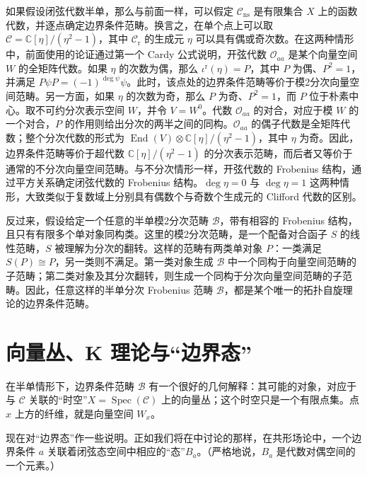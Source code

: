 如果假设闭弦代数半单，那么与前面一样，可以假定 $\mathcal{C}_{\mathrm{ns}}$ 是有限集合 $X$ 上的函数代数，并逐点确定边界条件范畴。换言之，在单个点上可以取 $\mathcal{C}=\mathbb{C}[\eta]/(\eta^2-1)$，其中 $\mathcal{C}_{\mathrm{r}}$ 的生成元 $\eta$ 可以具有偶或奇次数。在这两种情形中，前面使用的论证通过第一个 Cardy 公式说明，开弦代数 $\mathcal{O}_{aa}$ 是某个向量空间 $W$ 的全矩阵代数。如果 $\eta$ 的次数为偶，那么 $\iota^{\mathrm{r}}(\eta)=P$，其中 $P$ 为偶、$P^2=1$，并满足 $P\psi P=(-1)^{\deg\psi}\psi$。此时，该点处的边界条件范畴等价于模2分次向量空间范畴。另一方面，如果 $\eta$ 的次数为奇，那么 $P$ 为奇、$P^2=1$，而 $P$ 位于朴素中心。取不可约分次表示空间 $W$，并令 $V=W^0$。代数 $\mathcal{O}_{aa}$ 的对合，对应于模 $W$ 的一个对合，$P$ 的作用则给出分次的两半之间的同构。$\mathcal{O}_{aa}$ 的偶子代数是全矩阵代数；整个分次代数的形式为 $\operatorname{End}(V)\otimes\mathbb{C}[\eta]/(\eta^2-1)$，其中 $\eta$ 为奇。因此，边界条件范畴等价于超代数 $\mathbb{C}[\eta]/(\eta^2-1)$ 的分次表示范畴，而后者又等价于通常的不分次向量空间范畴。与不分次情形一样，开弦代数的 Frobenius 结构，通过平方关系确定闭弦代数的 Frobenius 结构。$\deg\eta=0$ 与 $\deg\eta=1$ 这两种情形，大致类似于复数域上分别具有偶数个与奇数个生成元的 Clifford 代数的区别。

反过来，假设给定一个任意的半单模2分次范畴 $\mathcal{B}$，带有相容的 Frobenius 结构，且只有有限多个单对象同构类。这里的模2分次范畴，是一个配备对合函子 $S$ 的线性范畴，$S$ 被理解为分次的翻转。这样的范畴有两类单对象 $P$：一类满足 $S(P)\cong P$，另一类则不满足。第一类对象生成 $\mathcal{B}$ 中一个同构于向量空间范畴的子范畴；第二类对象及其分次翻转，则生成一个同构于分次向量空间范畴的子范畴。因此，任意这样的半单分次 Frobenius 范畴 $\mathcal{B}$，都是某个唯一的拓扑自旋理论的边界条件范畴。

\section{向量丛、K 理论与“边界态”}\label{sec:2.3}

在半单情形下，边界条件范畴 $\mathcal{B}$ 有一个很好的几何解释：其可能的对象，对应于与 $\mathcal{C}$ 关联的“时空”$X=\operatorname{Spec}(\mathcal{C})$ 上的向量丛；这个时空只是一个有限点集。点 $x$ 上方的纤维，就是向量空间 $W_x$。

现在对“边界态”作一些说明。正如我们将在中讨论的那样，在共形场论中，一个边界条件 $a$ 关联着闭弦态空间中相应的“态”$B_a$。（严格地说，$B_a$ 是代数对偶空间的一个元素。）

